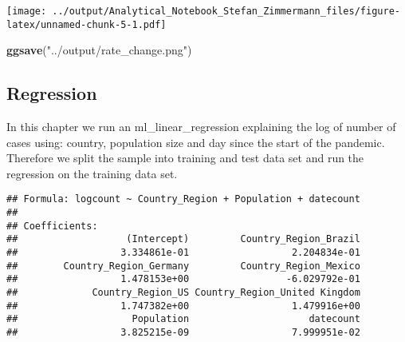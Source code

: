\documentclass[]{article}
\newenvironment{Shaded}{\begin{snugshade}}{\end{snugshade}}
\newcommand{\DataTypeTok}[1]{\textcolor[rgb]{0.13,0.29,0.53}{#1}}
\newcommand{\DecValTok}[1]{\textcolor[rgb]{0.00,0.00,0.81}{#1}}
\newcommand{\FloatTok}[1]{\textcolor[rgb]{0.00,0.00,0.81}{#1}}
\newcommand{\KeywordTok}[1]{\textcolor[rgb]{0.13,0.29,0.53}{\textbf{#1}}}
\newcommand{\NormalTok}[1]{#1}
\newcommand{\OperatorTok}[1]{\textcolor[rgb]{0.81,0.36,0.00}{\textbf{#1}}}
\newcommand{\OtherTok}[1]{\textcolor[rgb]{0.56,0.35,0.01}{#1}}
\newcommand{\StringTok}[1]{\textcolor[rgb]{0.31,0.60,0.02}{#1}}
\begin{document}
\texttt{[image: ../output/Analytical\_Notebook\_Stefan\_Zimmermann\_files/figure-latex/unnamed-chunk-5-1.pdf]}

\begin{Shaded}
\begin{Highlighting}[]
\KeywordTok{ggsave}\NormalTok{(}\StringTok{"../output/rate_change.png"}\NormalTok{)}
\end{Highlighting}
\end{Shaded}

\hypertarget{regression}{%
\subsection{Regression}\label{regression}}

In this chapter we run an ml\_linear\_regression explaining the log of
number of cases using: country, population size and day since the start
of the pandemic. Therefore we split the sample into training and test
data set and run the regression on the training data set.

\begin{Shaded}
\end{Shaded}

\begin{verbatim}
## Formula: logcount ~ Country_Region + Population + datecount
## 
## Coefficients:
##                   (Intercept)         Country_Region_Brazil 
##                  3.334861e-01                  2.204834e-01 
##        Country_Region_Germany         Country_Region_Mexico 
##                  1.478153e+00                 -6.029792e-01 
##             Country_Region_US Country_Region_United Kingdom 
##                  1.747382e+00                  1.479916e+00 
##                    Population                     datecount 
##                  3.825215e-09                  7.999951e-02
\end{verbatim}
\end{document}
